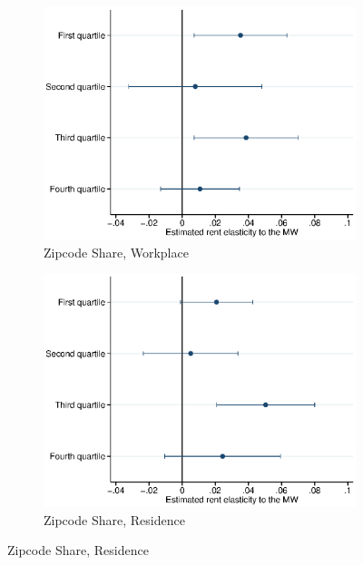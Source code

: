 \begin{figure}[htb!]
\begin{subfigure}[b]{.5\textwidth}
	\end{subfigure}\\
	\begin{subfigure}[b]{.5\textwidth}
		\caption{Zipcode Share, Workplace}
		\includegraphics[width = \textwidth]
		{../../analysis/first_differences_expmw/output/fd_static_heter_walall_29y_lowinc_zsh_st_qtl.eps}
	\end{subfigure}%
	\begin{subfigure}[b]{.5\textwidth}
		\caption{Zipcode Share, Residence}
		\includegraphics[width = \textwidth]
		{../../analysis/first_differences_expmw/output/fd_static_heter_halall_29y_lowinc_zsh_st_qtl.eps}
	\end{subfigure}
	\begin{minipage}{\textwidth}\footnotesize

\end{minipage}
\end{figure}
